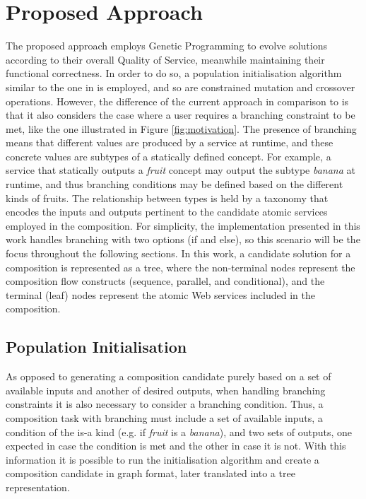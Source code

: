 \documentclass[conference]{IEEEtran}
\begin{document}
\section{Proposed Approach}\label{approach}
The proposed approach employs Genetic Programming to evolve solutions according to their overall Quality of Service, meanwhile maintaining their functional 
correctness. In order to do so, a population initialisation algorithm similar to the one in \cite{wang2013genetic} is employed, and so are constrained mutation and crossover operations. However, the difference of the current approach in comparison to \cite{wang2013genetic} is that it also considers the case where a user requires a branching constraint to be met, like the one illustrated in Figure \ref{fig:motivation}. The presence of branching means that different values are produced by a service at runtime, and these concrete values are subtypes of a statically defined concept. For example, a service that statically outputs a \textit{fruit} concept may output the subtype \textit{banana} at runtime, and thus branching conditions may be defined based on the different kinds of fruits. The relationship between types is held by a taxonomy that encodes the inputs and outputs pertinent to the candidate atomic services employed in the composition. For simplicity, the implementation presented in this work handles branching with two options (if and else), so this scenario will be the focus throughout the following sections. In this work, a candidate solution for a composition is represented as a tree, where the non-terminal nodes represent the composition flow constructs (sequence, parallel, and conditional), and the terminal (leaf) nodes represent the atomic Web services included in the composition.

\subsection{Population Initialisation}\label{init}
As opposed to generating a composition candidate purely based on a set of available inputs and another of desired outputs, when handling branching constraints it is also necessary to consider a branching condition. Thus, a composition task with branching must include a set of available inputs, a condition of the is-a kind (e.g. if \textit{fruit} is a \textit{banana}), and two sets of outputs, one expected in case the condition is met and the other in case it is not. With this information it is possible to run the initialisation algorithm and create a composition candidate in graph format, later translated into a tree representation.
\end{document}
